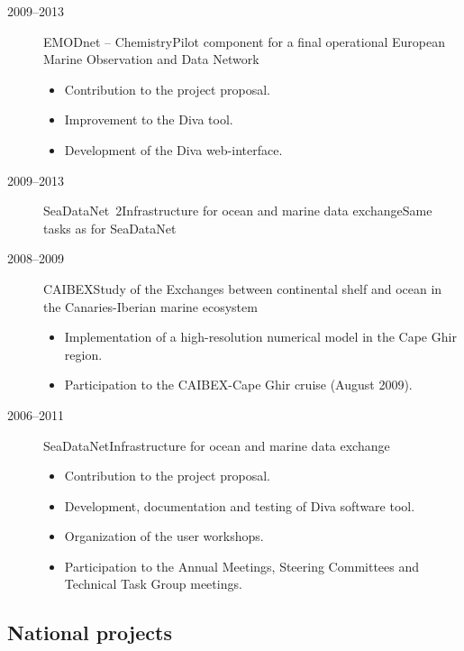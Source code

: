 \documentclass[11pt,a4paper,svgnames]{article}
\begin{document}
\begin{description}
\item[2009--2013] {EMODnet -- Chemistry}{Pilot component for a final operational European Marine Observation and Data Network}{}{}{
\begin{itemize}
\item Contribution to the project proposal.
\item Improvement to the Diva tool.
\item Development of the Diva web-interface.
\end{itemize}
}
\item[2009--2013] {SeaDataNet~2}{Infrastructure for ocean and marine data exchange}{Same tasks as for SeaDataNet}{}{}
\item[2008--2009] {CAIBEX}{Study of the Exchanges between continental shelf and ocean in the Canaries-Iberian marine ecosystem}{}{}{
\begin{itemize}
\item Implementation of a high-resolution numerical model in the Cape Ghir region.
\item Participation to the CAIBEX-Cape Ghir cruise (August 2009).
\end{itemize}
}
\item[2006--2011] {SeaDataNet}{Infrastructure for ocean and marine data exchange}{}{}{
\begin{itemize}
\item Contribution to the project proposal.
\item Development, documentation and testing of Diva software tool.
\item Organization of the user workshops.
\item Participation to the Annual Meetings, Steering Committees and Technical Task Group meetings.
\end{itemize}
}

\end{description}


\subsection{National projects}
\end{document}
